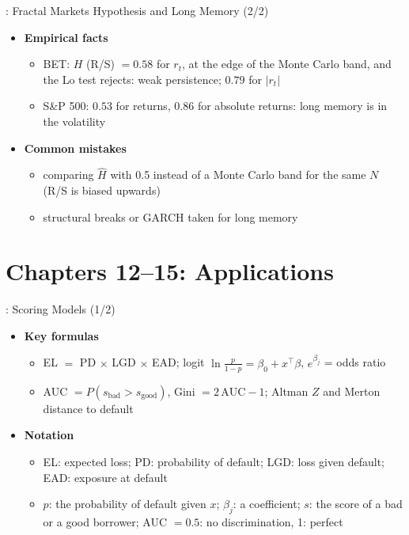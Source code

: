 \begin{frame}{: Fractal Markets Hypothesis and Long Memory (2/2)}
\itemsize{\small}
\begin{itemize}
    \item \textbf{Empirical facts}
    \begin{itemize}
        \item BET: $H$ (R/S) $= 0.58$ for $r_t$, at the edge of the Monte Carlo band, and the Lo test rejects: weak persistence; $0.79$ for $|r_t|$
        \item S\&P 500: $0.53$ for returns, $0.86$ for absolute returns: long memory is in the volatility
    \end{itemize}
    \item \textbf{Common mistakes}
    \begin{itemize}
        \item comparing $\hat H$ with 0.5 instead of a Monte Carlo band for the same $N$ (R/S is biased upwards)
        \item structural breaks or GARCH taken for long memory
    \end{itemize}
\end{itemize}
\end{frame}


\section{Chapters 12--15: Applications}

\begin{frame}{: Scoring Models (1/2)}
\itemsize{\small}
\begin{itemize}
    \item \textbf{Key formulas}
    \begin{itemize}
        \item EL $=$ PD $\times$ LGD $\times$ EAD; logit $\ln\frac{p}{1-p} = \beta_0 + x^\top\beta$, $e^{\beta_j}$ = odds ratio
        \item AUC $= P(s_{\text{bad}} > s_{\text{good}})$, Gini $= 2\,\mathrm{AUC} - 1$; Altman $Z$ and Merton distance to default 
    \end{itemize}
    \item \textbf{Notation}
    \begin{itemize}
        \item EL: expected loss; PD: probability of default; LGD: loss given default; EAD: exposure at default
        \item $p$: the probability of default given $x$; $\beta_j$: a coefficient; $s$: the score of a bad or a good borrower; AUC $= 0.5$: no discrimination, 1: perfect
    \end{itemize}
\end{itemize}
\end{frame}

